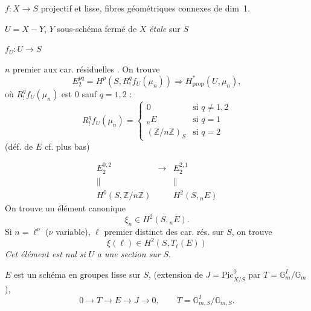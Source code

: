\documentclass[11pt,a4paper]{article}
\begin{document}
$f : X \to S$ projectif et lisse, fibres géométriques connexes de dim~1.

$U = X - Y$, \quad $Y$ sous-schéma fermé de $X$ \emph{étale} sur $S$

$f_U : U \to S$

$n$ premier aux car. résiduelles . On trouve
\[
  E_2^{pq} = H^p(S, R^q_! f_U(\mu_n)) \Longrightarrow H^*_{\mathrm{prop}}(U, \mu_n),
\]
où $R^q_! f_U(\mu_n)$ est $0$ sauf $q = 1, 2$ :
\[
  R^q_! f_U(\mu_n) =
  \begin{cases}
    0 & \text{si } q \neq 1, 2 \\
    {}_n E & \text{si } q = 1 \\
    (\mathbb{Z}/n\mathbb{Z})_S & \text{si } q = 2
  \end{cases}
\]
(déf. de $E$ cf. plus bas)

\[
  \begin{array}{ccc}
    E_2^{0,2} & \longrightarrow & E_2^{2,1} \\
    \| & & \| \\
    H^0(S, \mathbb{Z}/n\mathbb{Z}) & & H^2(S, {}_n E)
  \end{array}
\]
On trouve un élément canonique
\[
  \xi_n \in H^2(S, {}_n E).
\]
Si $n = \ell^\nu$ ($\nu$ variable), $\ell$ premier distinct des car. rés. sur $S$, on trouve
\[
  \boxed{\xi(\ell) \in H^2(S, T_\ell(E))}
\]
\emph{Cet élément est nul si} $U$ \emph{a une section sur} $S$.

$E$ est un schéma en groupes lisse sur $S$, \struck{\ill{}}  (extension de $J = \underline{\mathrm{Pic}}^0_{X/S}$ par $T = \mathbb{G}_m^I / \mathbb{G}_m$ ),
\[
  0 \to T \to E \to J \to 0, \qquad T = \mathbb{G}_{m,S}^I / \mathbb{G}_{m,S}.
\]
\end{document}
